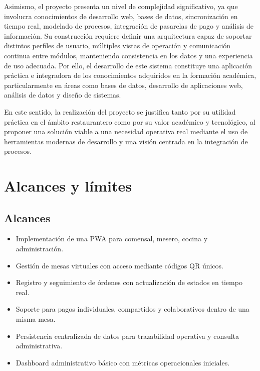 \documentclass[12pt]{report}
\begin{document}
Asimismo, el proyecto presenta un nivel de complejidad significativo, ya que involucra conocimientos de desarrollo web, bases de datos, sincronización en tiempo real, modelado de procesos, integración de pasarelas de pago y análisis de información. Su construcción requiere definir una arquitectura capaz de soportar distintos perfiles de usuario, múltiples vistas de operación y comunicación continua entre módulos, manteniendo consistencia en los datos y una experiencia de uso adecuada. Por ello, el desarrollo de este sistema constituye una aplicación práctica e integradora de los conocimientos adquiridos en la formación académica, particularmente en áreas como bases de datos, desarrollo de aplicaciones web, análisis de datos y diseño de sistemas.

En este sentido, la realización del proyecto se justifica tanto por su utilidad práctica en el ámbito restaurantero como por su valor académico y tecnológico, al proponer una solución viable a una necesidad operativa real mediante el uso de herramientas modernas de desarrollo y una visión centrada en la integración de procesos.

\section{Alcances y límites}
\subsection{Alcances}
\begin{itemize}[leftmargin=*, itemsep=0.35em]
  \item Implementación de una PWA para comensal, mesero, cocina y administración.
  \item Gestión de mesas virtuales con acceso mediante códigos QR únicos.
  \item Registro y seguimiento de órdenes con actualización de estados en tiempo real.
  \item Soporte para pagos individuales, compartidos y colaborativos dentro de una misma mesa.
  \item Persistencia centralizada de datos para trazabilidad operativa y consulta administrativa.
  \item Dashboard administrativo básico con métricas operacionales iniciales.
\end{itemize}
\end{document}
